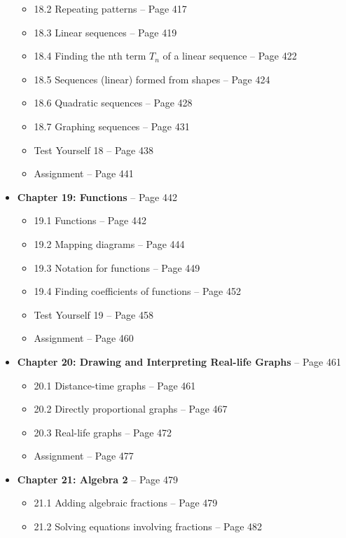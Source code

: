 \documentclass{article}
\begin{document}
\begin{itemize}
\begin{itemize}
            \item 18.2 Repeating patterns -- Page 417
            \item 18.3 Linear sequences -- Page 419
            \item 18.4 Finding the nth term \(T_n\) of a linear sequence -- Page 422
            \item 18.5 Sequences (linear) formed from shapes -- Page 424
            \item 18.6 Quadratic sequences -- Page 428
            \item 18.7 Graphing sequences -- Page 431
            \item Test Yourself 18 -- Page 438
            \item Assignment -- Page 441
        \end{itemize}
    \item \textbf{Chapter 19: Functions} -- Page 442
        \begin{itemize}
            \item 19.1 Functions -- Page 442
            \item 19.2 Mapping diagrams -- Page 444
            \item 19.3 Notation for functions -- Page 449
            \item 19.4 Finding coefficients of functions -- Page 452
            \item Test Yourself 19 -- Page 458
            \item Assignment -- Page 460
        \end{itemize}
    \item \textbf{Chapter 20: Drawing and Interpreting Real-life Graphs} -- Page 461
        \begin{itemize}
            \item 20.1 Distance-time graphs -- Page 461
            \item 20.2 Directly proportional graphs -- Page 467
            \item 20.3 Real-life graphs -- Page 472
            \item Assignment -- Page 477
        \end{itemize}
    \item \textbf{Chapter 21: Algebra 2} -- Page 479
        \begin{itemize}
            \item 21.1 Adding algebraic fractions -- Page 479
            \item 21.2 Solving equations involving fractions -- Page 482

\end{itemize}
\end{itemize}
\end{document}
